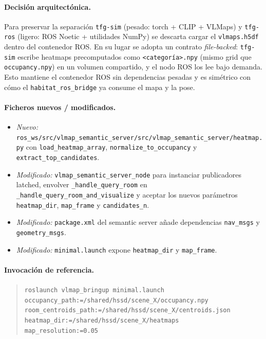 \documentclass[11pt,a4paper]{article}
\begin{document}
\paragraph{Decisión arquitectónica.} Para preservar la separación
\texttt{tfg-sim} (pesado: torch + CLIP + VLMaps) y \texttt{tfg-ros}
(ligero: ROS Noetic + utilidades NumPy) se descarta cargar el
\texttt{vlmaps.h5df} dentro del contenedor ROS. En su lugar se adopta un
contrato \emph{file-backed}: \texttt{tfg-sim} escribe heatmaps
precomputados como \texttt{<categoría>.npy} (mismo grid que
\texttt{occupancy.npy}) en un volumen compartido, y el nodo ROS los lee
bajo demanda. Esto mantiene el contenedor ROS sin dependencias pesadas y
es simétrico con cómo el \texttt{habitat\_ros\_bridge} ya consume el
mapa y la pose.

\paragraph{Ficheros nuevos / modificados.}
\begin{itemize}
  \item \emph{Nuevo:}
        \texttt{ros\_ws/src/vlmap\_semantic\_server/src/vlmap\_semantic\_server/heatmap.py}
        con \texttt{load\_heatmap\_array}, \texttt{normalize\_to\_occupancy}
        y \texttt{extract\_top\_candidates}.
  \item \emph{Modificado:} \texttt{vlmap\_semantic\_server\_node} para
        instanciar publicadores latched, envolver \texttt{\_handle\_query\_room}
        en \texttt{\_handle\_query\_room\_and\_visualize} y aceptar los
        nuevos parámetros \texttt{heatmap\_dir}, \texttt{map\_frame} y
        \texttt{candidates\_n}.
  \item \emph{Modificado:} \texttt{package.xml} del semantic server añade
        dependencias \texttt{nav\_msgs} y \texttt{geometry\_msgs}.
  \item \emph{Modificado:} \texttt{minimal.launch} expone
        \texttt{heatmap\_dir} y \texttt{map\_frame}.
\end{itemize}

\paragraph{Invocación de referencia.}
\begin{quote}
\texttt{roslaunch vlmap\_bringup minimal.launch}\\
\hspace*{1em}\texttt{occupancy\_path:=/shared/hssd/scene\_X/occupancy.npy}\\
\hspace*{1em}\texttt{room\_centroids\_path:=/shared/hssd/scene\_X/centroids.json}\\
\hspace*{1em}\texttt{heatmap\_dir:=/shared/hssd/scene\_X/heatmaps}\\
\hspace*{1em}\texttt{map\_resolution:=0.05}
\end{quote}
\end{document}

